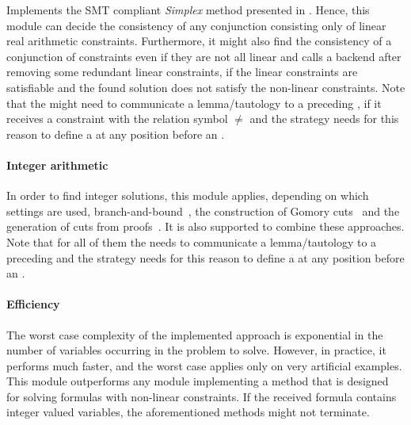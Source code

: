 Implements the SMT compliant \emph{Simplex} method presented in \cite{}.
Hence, this module can decide the consistency of any conjunction
consisting only of linear real arithmetic constraints. Furthermore,
it might also find the consistency of a conjunction of constraints
even if they are not all linear and calls a backend after removing
some redundant linear constraints, if the linear constraints are satisfiable
and the found solution does not satisfy the non-linear constraints. Note that the 
\lraModuleClass might need to communicate a lemma/tautology to a preceding 
\satModuleClass, if it receives a constraint with the relation symbol $\neq$
 and the strategy needs for this reason to define a \satModuleClass at any 
 position before an \lraModuleClass.

\paragraph{Integer arithmetic} In order to find integer solutions, this
module applies, depending on which settings are used, branch-and-bound~\cite{},
the construction of Gomory cuts~\cite{} and the generation of cuts from 
proofs~\cite{}. It is also supported to combine these approaches. Note that
for all of them the \lraModuleClass needs to communicate a lemma/tautology to a
preceding \satModuleClass and the strategy needs for this reason to define a 
\satModuleClass at any position before an \lraModuleClass.

\paragraph{Efficiency} The worst case complexity of the implemented
approach is exponential in the number of variables occurring in the
problem to solve. However, in practice, it performs much faster, and
the worst case applies only on very artificial examples. This module
outperforms any module implementing a method that is designed for 
solving formulas with non-linear constraints. If the received formula
contains integer valued variables, the aforementioned methods might not
terminate.